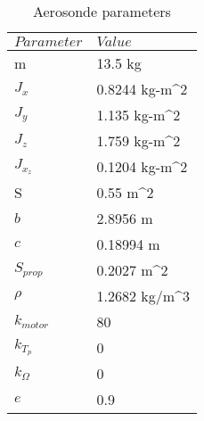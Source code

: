 \documentclass[12pt]{article}
\begin{document}
\begin{table}
\centering
\begin{tabular}{ll}
$Parameter$ & $Value$  \\\hline
m & 13.5 kg \\
$J_x$ & 0.8244 kg-m^2  \\
$J_y$ & 1.135 kg-m^2\\
$J_z$ & 1.759 kg-m^2\\
$J_{x_z}$ & 0.1204 kg-m^2\\
S & 0.55 m^2\\
$b$ & 2.8956 m\\
$c$ & 0.18994 m\\
$S_{prop}$  & 0.2027 m^2\\
$\rho$ & 1.2682 kg/m^3\\
$k_{motor}$  & 80\\
$k_{T_p}$ & 0  \\
$k_\Omega$ & 0 \\
$e$ & 0.9 \\
\end{tabular}
\caption{Aerosonde parameters}
\label{tab:uav_params}
\end{table}




\end{document}
